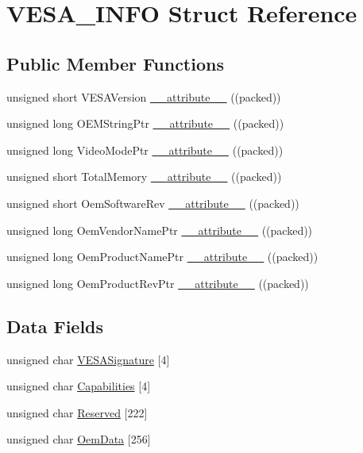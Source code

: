 \hypertarget{structVESA__INFO}{}\section{V\+E\+S\+A\+\_\+\+I\+N\+FO Struct Reference}
\label{structVESA__INFO}
\subsection*{Public Member Functions}
\begin{DoxyCompactItemize}
\item 
unsigned short V\+E\+S\+A\+Version \hyperlink{structVESA__INFO_ab14eb7a68b9de88409983f8bc6f79b64}{\+\_\+\+\_\+attribute\+\_\+\+\_\+} ((packed))
\item 
unsigned long O\+E\+M\+String\+Ptr \hyperlink{structVESA__INFO_a922a9b093cb718083725ddfd86f9285b}{\+\_\+\+\_\+attribute\+\_\+\+\_\+} ((packed))
\item 
unsigned long Video\+Mode\+Ptr \hyperlink{structVESA__INFO_a9d7b6d933201c8c12672214450d858a0}{\+\_\+\+\_\+attribute\+\_\+\+\_\+} ((packed))
\item 
unsigned short Total\+Memory \hyperlink{structVESA__INFO_a6e1cc548c457c54005c0116386a1b4a6}{\+\_\+\+\_\+attribute\+\_\+\+\_\+} ((packed))
\item 
unsigned short Oem\+Software\+Rev \hyperlink{structVESA__INFO_a566be4a4dd3ba397219aff084810f2e7}{\+\_\+\+\_\+attribute\+\_\+\+\_\+} ((packed))
\item 
unsigned long Oem\+Vendor\+Name\+Ptr \hyperlink{structVESA__INFO_a231abb3e5be2997bfdc7fe1dc621c309}{\+\_\+\+\_\+attribute\+\_\+\+\_\+} ((packed))
\item 
unsigned long Oem\+Product\+Name\+Ptr \hyperlink{structVESA__INFO_a45c3557b3f3b45d819de8a750980938b}{\+\_\+\+\_\+attribute\+\_\+\+\_\+} ((packed))
\item 
unsigned long Oem\+Product\+Rev\+Ptr \hyperlink{structVESA__INFO_a4b96a07f6c3ce3ba7efce50bcbc333fe}{\+\_\+\+\_\+attribute\+\_\+\+\_\+} ((packed))
\end{DoxyCompactItemize}
\subsection*{Data Fields}
\begin{DoxyCompactItemize}
\item 
unsigned char \hyperlink{structVESA__INFO_a29513615169621c4e98f3423197a4af2}{V\+E\+S\+A\+Signature} \mbox{[}4\mbox{]}
\item 
unsigned char \hyperlink{structVESA__INFO_ad758672d9e52736faab1d46d9d39c29a}{Capabilities} \mbox{[}4\mbox{]}
\item 
unsigned char \hyperlink{structVESA__INFO_aa2b5b63d3b2d14b3abbd73f749e07fa5}{Reserved} \mbox{[}222\mbox{]}
\item 
unsigned char \hyperlink{structVESA__INFO_a46a8c524e362968b69202f7210bac1e4}{Oem\+Data} \mbox{[}256\mbox{]}
\end{DoxyCompactItemize}


